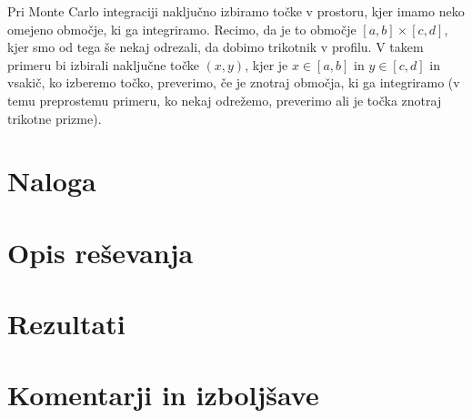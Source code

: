 \documentclass[a4paper]{article}
\begin{document}
Pri Monte Carlo integraciji naključno izbiramo točke v prostoru, kjer imamo neko omejeno območje, ki ga integriramo.
Recimo, da je to območje $[a,b] \times [c,d]$, kjer smo od tega še nekaj odrezali, da dobimo trikotnik v profilu. V takem primeru 
bi izbirali naključne točke $(x,y)$, kjer je $x \in [a,b]$ in $y \in [c,d]$ in vsakič, ko izberemo točko, preverimo, če je
znotraj območja, ki ga integriramo (v temu preprostemu primeru, ko nekaj odrežemo, preverimo ali je točka znotraj trikotne prizme).



\section{Naloga}

\section{Opis reševanja}

\section{Rezultati}


\section{Komentarji in izboljšave}

\newpage


\end{document}

